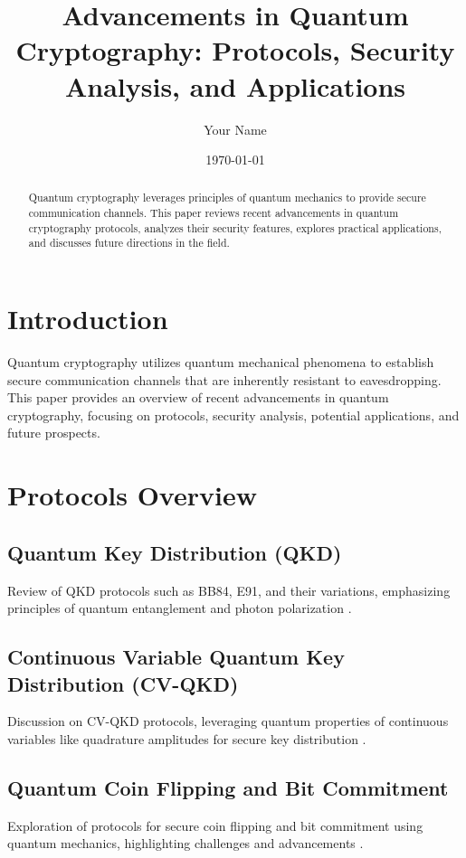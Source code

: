 \documentclass[12pt]{article}
\title{Advancements in Quantum Cryptography: Protocols, Security Analysis, and Applications}
\author{Your Name}
\date{\today}
\begin{document}
\maketitle

\begin{abstract}
Quantum cryptography leverages principles of quantum mechanics to provide secure communication channels. This paper reviews recent advancements in quantum cryptography protocols, analyzes their security features, explores practical applications, and discusses future directions in the field.
\end{abstract}

\section{Introduction}
Quantum cryptography utilizes quantum mechanical phenomena to establish secure communication channels that are inherently resistant to eavesdropping. This paper provides an overview of recent advancements in quantum cryptography, focusing on protocols, security analysis, potential applications, and future prospects.

\section{Protocols Overview}
\subsection{Quantum Key Distribution (QKD)}
Review of QKD protocols such as BB84, E91, and their variations, emphasizing principles of quantum entanglement and photon polarization \citep{bennett1984quantum, ekert1991quantum}.

\subsection{Continuous Variable Quantum Key Distribution (CV-QKD)}
Discussion on CV-QKD protocols, leveraging quantum properties of continuous variables like quadrature amplitudes for secure key distribution \citep{grosshans2003quantum, weedbrook2012continuous}.

\subsection{Quantum Coin Flipping and Bit Commitment}
Exploration of protocols for secure coin flipping and bit commitment using quantum mechanics, highlighting challenges and advancements \citep{ambainis2001coin, lo2002quantum}.
\end{document}
